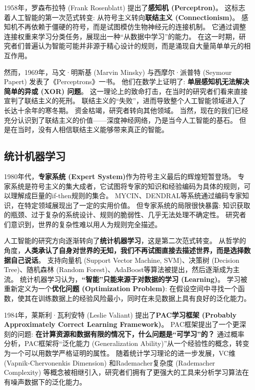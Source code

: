 \documentclass[12pt, a4paper]{article}
\begin{document}
1958年，罗森布拉特 (Frank Rosenblatt) 提出了\textbf{感知机 (Perceptron)}。
这标志着人工智能的第一次范式转变: 从符号主义转向\textbf{联结主义 (Connectionism)}。
感知机不再依赖于僵硬的符号，而是试图模仿生物神经元的连接机制。
它通过调整连接权重来学习分类任务，展现出一种“从数据中学习”的能力。
在这一时期，研究者们普遍认为智能可能并非源于精心设计的规则，而是涌现自大量简单单元的相互作用。

然而，1969年，马文·明斯基 (Marvin Minsky) 与西摩尔·派普特 (Seymour Papert) 发表了《Perceptrons》一书。
他们在数学上证明了: \textbf{单层感知机无法解决简单的异或 (XOR) 问题}。
这一理论上的致命打击，在当时的研究者们看来直接宣判了联结主义的死刑。
联结主义的“失败”，进而导致整个人工智能领域进入了长达十余年的寒冬期。
资金枯竭，研究者转向其他领域。
当然，现在的我们已经充分认识到了联结主义的价值——深度神经网络，乃是当今人工智能的基石。
但是在当时，没有人相信联结主义能够带来真正的智能。

\subsection{统计机器学习}

1980年代，\textbf{专家系统 (Expert System)}作为符号主义最后的辉煌短暂登场。
专家系统是符号主义的集大成者，它试图将专家的知识和经验编码为具体的规则，可以理解成巨量的if-then规则的集合。
MYCIN、DENDRAL等系统通过编码专家知识，在特定领域展现出了一定的实用价值。
但专家系统的局限很快暴露: 知识获取的瓶颈、过于复杂的系统设计、规则的脆弱性、几乎无法处理不确定性。
研究者们意识到，世界的复杂性难以用人为规则完全描述。

人工智能的研究方向逐渐转向了\textbf{统计机器学习}，这是第二次范式转变。
从哲学的角度，\textbf{人类承认了自身对世界的无知，我们不再试图直接去描述世界，而是选择数据自己说话}。
支持向量机 (Support Vector Machine, SVM)、决策树 (Decision Tree)、随机森林 (Random Forest)、AdaBoost等算法被提出，然后逐渐成为主流。
统计机器学习认为，\textbf{“智能”只能来源于对数据的学习 (Learning)}。
学习被重新定义为一个\textbf{优化问题 (Optimization Problem)}: 在假设空间中寻找一个函数，使其在训练数据上的经验风险最小，同时在未见数据上具有良好的泛化能力。

1984年，莱斯利·瓦利安特 (Leslie Valiant) 提出了\textbf{PAC学习框架 (Probably Approximately Correct Learning Framework)}。
PAC框架提出了一个更深刻的问题: \textbf{在计算资源和数据有限的情况下，什么问题是“可学习”的？}
通过概率分析，PAC框架将“泛化能力 (Generalization Ability)”从一个经验性的概念，转变为一个可以用数学严格证明的属性。
随着统计学习理论的进一步发展，VC维 (Vapnik-Chervonenkis Dimension) 和Rademacher复杂度 (Rademacher Complexity) 等概念被相继引入，研究者们拥有了更强大的工具来分析学习算法在有噪声数据下的泛化能力。
\end{document}

